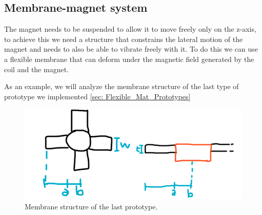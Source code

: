 \subsection{Membrane-magnet system}
The magnet needs to be suspended to allow it to move freely only on the z-axis, to achieve this we need a structure that constrains the lateral motion of the magnet and needs to also be able to vibrate freely with it.
To do this we can use a flexible membrane that can deform under the magnetic field generated by the coil and the magnet. 

As an example, we will analyze the membrane structure of the last type of prototype we implemented \ref{sec: Flexible_Mat_Prototypes}
\begin{figure}
    \centering
    \includegraphics[scale=0.4]{Chapters/Chapter2/Modelling_of_Entire_System/Figures/membrane.png} %
    \caption[Membrane structure]{Membrane structure of the last prototype.}
    \label{fig: Membrane structure}
\end{figure}

